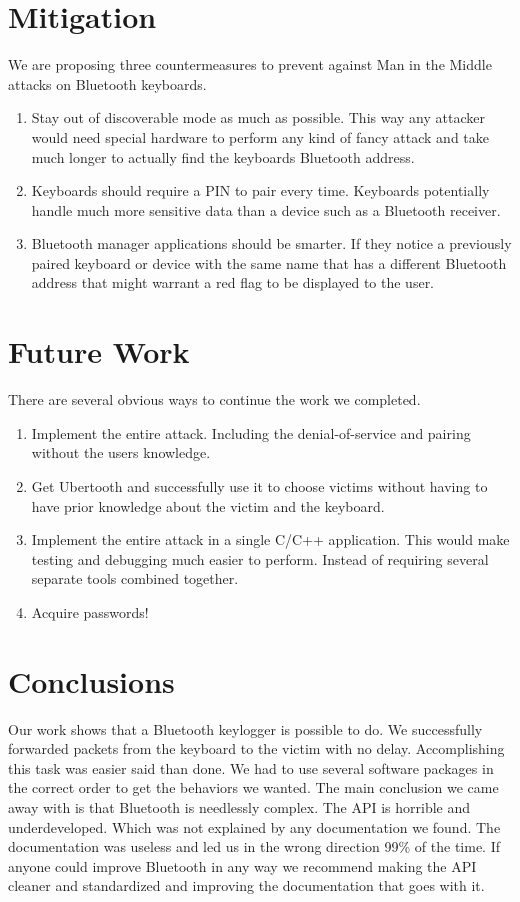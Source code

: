 \documentclass{acm_proc_article-sp}
\begin{document}
\section{Mitigation}
We are proposing three countermeasures to prevent against Man in the Middle attacks on Bluetooth keyboards.
\begin{enumerate}
\item Stay out of discoverable mode as much as possible. This way any attacker would need special hardware to perform any kind of fancy attack and take much longer to actually find the keyboards Bluetooth address.
\item Keyboards should require a PIN to pair every time. Keyboards potentially handle much more sensitive data than a device such as a Bluetooth receiver.
\item Bluetooth manager applications should be smarter. If they notice a previously paired keyboard or device with the same name that has a different Bluetooth address that might warrant a red flag to be displayed to the user.
\end{enumerate}

\section{Future Work}
There are several obvious ways to continue the work we completed. 
\begin{enumerate}
\item Implement the entire attack. Including the denial-of-service and pairing without the users knowledge.
\item Get Ubertooth and successfully use it to choose victims without having to have prior knowledge about the victim and the keyboard.
\item Implement the entire attack in a single C/C++ application. This would make testing and debugging much easier to perform. Instead of requiring several separate tools combined together.
\item Acquire passwords!
\end{enumerate}

\section{Conclusions}
Our work shows that a Bluetooth keylogger is possible to do. We successfully forwarded packets from the keyboard to the victim with no delay. Accomplishing this task was easier said than done. We had to use several software packages in the correct order to get the behaviors we wanted. The main conclusion we came away with is that Bluetooth is needlessly complex. The API is horrible and underdeveloped. Which was not explained by any documentation we found. The documentation was useless and led us in the wrong direction 99\% of the time. If anyone could improve Bluetooth in any way we recommend making the API cleaner and standardized and improving the documentation that goes with it.

%


\balancecolumns
\end{document}
